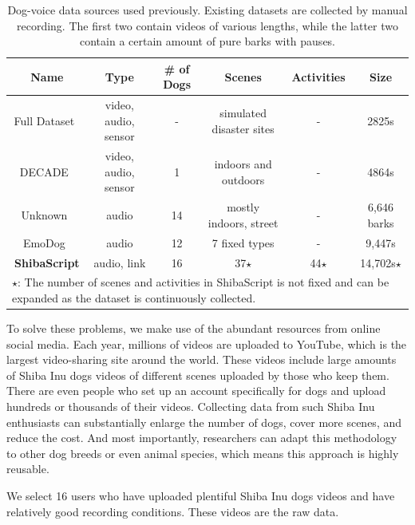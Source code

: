 \begin{table}[th]
\centering
\small
\begin{tabular}{c|c|c|c|c|c}
\hline
\textbf{Name} & \textbf{Type} & \textbf{\# of Dogs} & \textbf{Scenes} & \textbf{Activities} & \textbf{Size} \\
\hline
Full Dataset~\cite{ide2021rescue}& video, audio, sensor & - & simulated disaster sites & - & 2825s \\
DECADE~\cite{ehsani2018let} & video, audio, sensor & 1 & indoors and outdoors & - & 4864s \\
Unknown~\cite{molnar2008classification} & audio & 14 & mostly indoors, street & - & 6,646 barks \\
EmoDog~\cite{hantke2018my} & audio & 12 & 7 fixed types & - & 9,447s \\
\textbf{ShibaScript} & audio, link & 16 & 37$\star$ & 44$\star$ & 14,702s$\star$ \\
\hline
\multicolumn{6}{l}{\small $\star$: The number of scenes and activities in ShibaScript is not fixed and can be expanded as the dataset is continuously collected. }
\end{tabular}

\caption{Dog-voice data sources used previously. 
Existing datasets are collected by manual recording. 
The first two contain videos of various lengths, 
while the latter two contain a certain amount of pure barks with pauses.}
\label{tab:previousdataset}
\end{table}

To solve these problems, we make use of the abundant resources from online social media. Each year, millions of videos are uploaded to YouTube, which is the largest video-sharing site around the world. These videos include large amounts of Shiba Inu dogs videos of different scenes uploaded by those who keep them. 
There are even people who set up an account specifically for dogs and upload hundreds or thousands of their videos. Collecting data from such Shiba Inu enthusiasts can substantially enlarge the number of dogs, cover more scenes, and reduce the cost. And most importantly, researchers can adapt this methodology to other dog breeds or even animal species, which means this approach is highly reusable.

We select 16 users who have uploaded plentiful Shiba Inu dogs videos and have relatively good recording conditions. These videos are the raw data.

